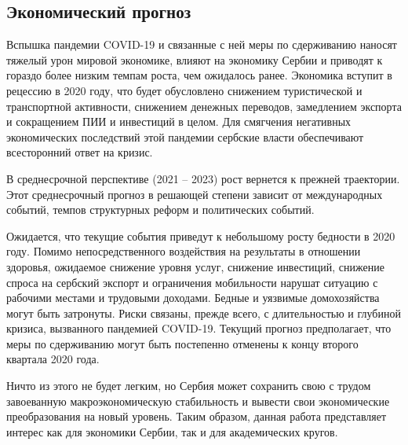 \subsection{Экономический прогноз}

Вспышка пандемии COVID-19 и связанные с ней меры по сдерживанию наносят тяжелый урон мировой экономике, влияют на экономику Сербии и приводят к гораздо более низким темпам роста, чем ожидалось ранее.
Экономика вступит в рецессию в 2020 году, что будет обусловлено снижением туристической и транспортной активности, снижением денежных переводов, замедлением экспорта и сокращением ПИИ и инвестиций в целом. Для смягчения негативных экономических последствий этой пандемии сербские власти обеспечивают всесторонний ответ на кризис.

В среднесрочной перспективе (2021 -- 2023) рост вернется к прежней траектории.
Этот среднесрочный прогноз в решающей степени зависит от международных событий, темпов структурных реформ и политических событий.

Ожидается, что текущие события приведут к небольшому росту бедности в 2020 году.
Помимо непосредственного воздействия на результаты в отношении здоровья, ожидаемое снижение уровня услуг, снижение инвестиций, снижение спроса на сербский экспорт и ограничения мобильности нарушат ситуацию с рабочими местами и трудовыми доходами.
Бедные и уязвимые домохозяйства могут быть затронуты.
Риски связаны, прежде всего, с длительностью и глубиной кризиса, вызванного пандемией COVID-19.
Текущий прогноз предполагает, что меры по сдерживанию могут быть постепенно отменены к концу второго квартала 2020 года.

Ничто из этого не будет легким, но Сербия может сохранить свою с трудом завоеванную макроэкономическую стабильность и вывести свои экономические преобразования на новый уровень.
Таким образом, данная работа представляет интерес как для экономики Сербии, так и для академических кругов.
